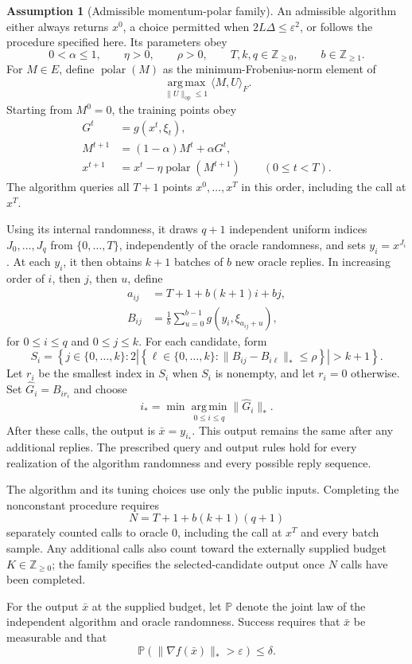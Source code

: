 \documentclass[10pt]{article}
\theoremstyle{definition}
\newtheorem{assumption}{Assumption}
\begin{document}
\begin{assumption}[Admissible momentum-polar family]
An admissible algorithm either always returns $x^0$, a choice permitted when $2L\Delta\leq\varepsilon^2$, or follows the procedure specified here. Its parameters obey
\[
0<\alpha\leq1,\qquad \eta>0,\qquad \rho>0,\qquad
T,k,q\in\mathbb{Z}_{\geq0},\qquad b\in\mathbb{Z}_{\geq1}.
\]
For $M\in E$, define $\operatorname{polar}(M)$ as the minimum-Frobenius-norm element of
\[
\underset{\|U\|_{\mathrm{op}}\leq1}{\operatorname{arg\,max}}
\langle M,U\rangle_F.
\]
Starting from $M^0=0$, the training points obey
\[
\begin{aligned}
G^t&=g(x^t,\xi_t),\\
M^{t+1}&=(1-\alpha)M^t+\alpha G^t,\\
x^{t+1}&=x^t-\eta\operatorname{polar}(M^{t+1})
\qquad (0\leq t<T).
\end{aligned}
\]
The algorithm queries all $T+1$ points $x^0,\ldots,x^T$ in this order, including the call at $x^T$.

Using its internal randomness, it draws $q+1$ independent uniform indices $J_0,\ldots,J_q$ from $\{0,\ldots,T\}$, independently of the oracle randomness, and sets $y_i=x^{J_i}$. At each $y_i$, it then obtains $k+1$ batches of $b$ new oracle replies. In increasing order of $i$, then $j$, then $u$, define
\[
\begin{aligned}
a_{ij}&=T+1+b(k+1)i+bj,\\
B_{ij}&=\frac1b\sum_{u=0}^{b-1}
 g(y_i,\xi_{a_{ij}+u}),
\end{aligned}
\]
for $0\leq i\leq q$ and $0\leq j\leq k$. For each candidate, form
\[
S_i=\left\{j\in\{0,\ldots,k\}:
2\left|\left\{\ell\in\{0,\ldots,k\}:
\|B_{ij}-B_{i\ell}\|_*\leq\rho\right\}\right|>k+1\right\}.
\]
Let $r_i$ be the smallest index in $S_i$ when $S_i$ is nonempty, and let $r_i=0$ otherwise. Set $\widehat G_i=B_{i r_i}$ and choose
\[
i_* = \min\underset{0\leq i\leq q}{\operatorname{arg\,min}}
\|\widehat G_i\|_*.
\]
After these calls, the output is $\bar{x}=y_{i_*}$. This output remains the same after any additional replies. The prescribed query and output rules hold for every realization of the algorithm randomness and every possible reply sequence.
\end{assumption}

The algorithm and its tuning choices use only the public inputs. Completing the nonconstant procedure requires
\[
N=T+1+b(k+1)(q+1)
\]
separately counted calls to oracle $0$, including the call at $x^T$ and every batch sample. Any additional calls also count toward the externally supplied budget $K\in\mathbb{Z}_{\geq0}$; the family specifies the selected-candidate output once $N$ calls have been completed.

For the output $\bar{x}$ at the supplied budget, let $\mathbb{P}$ denote the joint law of the independent algorithm and oracle randomness. Success requires that $\bar{x}$ be measurable and that
\[
\mathbb{P}\!\left(\|\nabla f(\bar{x})\|_*>\varepsilon\right)\leq\delta.
\]
\end{document}
